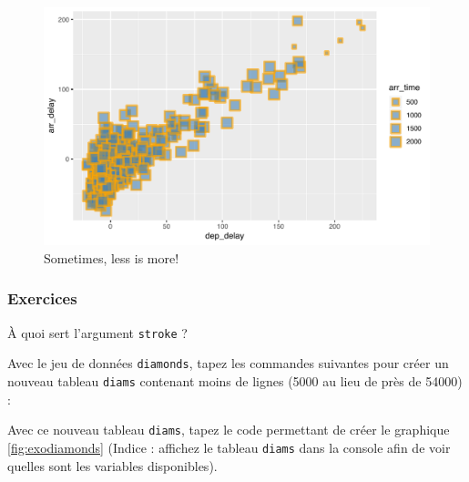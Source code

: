 \documentclass[a4paperpaper,]{article}
\newenvironment{Shaded}{\begin{snugshade}}{\end{snugshade}}
\newcommand{\CommentTok}[1]{\textcolor[rgb]{0.54,0.53,0.53}{#1}}
\newcommand{\DecValTok}[1]{\textcolor[rgb]{0.69,0.50,0.00}{#1}}
\newcommand{\KeywordTok}[1]{\textcolor[rgb]{0.12,0.11,0.11}{\textbf{#1}}}
\newcommand{\NormalTok}[1]{\textcolor[rgb]{0.12,0.11,0.11}{#1}}
\newcommand{\OperatorTok}[1]{\textcolor[rgb]{0.12,0.11,0.11}{#1}}
\newcommand{\StringTok}[1]{\textcolor[rgb]{0.75,0.01,0.01}{#1}}
\theoremstyle{definition}
\theoremstyle{definition}
\theoremstyle{definition}
\theoremstyle{remark}
\begin{document}
\begin{figure}[htpb]

{\centering \includegraphics[width=0.9\linewidth]{figure/badplot-1} 

}

\caption{Sometimes, less is more!}\label{fig:badplot}
\end{figure}

\hypertarget{exercices-3}{%
\subsubsection{Exercices}\label{exercices-3}}

À quoi sert l'argument \texttt{stroke} ?

Avec le jeu de données \texttt{diamonds}, tapez les commandes suivantes
pour créer un nouveau tableau \texttt{diams} contenant moins de lignes
(5000 au lieu de près de 54000) :

\begin{Shaded}
\end{Shaded}

Avec ce nouveau tableau \texttt{diams}, tapez le code permettant de
créer le graphique \ref{fig:exodiamonds} (Indice : affichez le tableau
\texttt{diams} dans la console afin de voir quelles sont les variables
disponibles).
\end{document}
